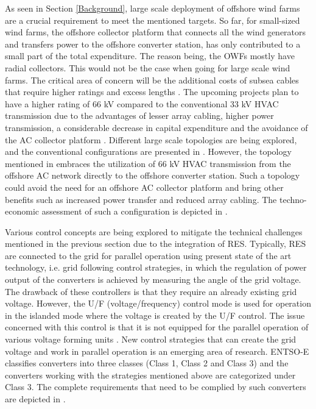 As seen in Section \ref{Background}, large scale deployment of offshore wind farms are a crucial requirement to meet the mentioned targets. So far, for small-sized wind farms, the offshore collector platform that connects all the wind generators and transfers power to the offshore converter station, has only contributed to a small part of the total expenditure. The reason being, the \gls{OWF}s mostly have radial collectors. This would not be the case when going for large scale wind farms. The critical area of concern will be the additional costs of subsea cables that require higher ratings and excess lengths \cite{quinonez-varela_electrical_2007}. The upcoming projects plan to have a higher rating of 66 kV compared to the conventional 33 kV \gls{HVAC} transmission due to the advantages of lesser array cabling, higher power transmission, a considerable decrease in capital expenditure and the avoidance of the \gls{AC} collector platform \cite{dnv66kv}. Different large scale topologies are being explored, and the conventional configurations are presented in \cite{guan_novel_2014}. However, the topology mentioned in \cite{lozada_ayala_dynamic_2018} embraces the utilization of 66 kV \gls{HVAC} transmission from the offshore \gls{AC} network directly to the offshore converter station. Such a topology could avoid the need for an offshore \gls{AC} collector platform and bring other benefits such as increased power transfer and reduced array cabling. The techno-economic assessment of such a configuration is depicted in \cite{misyris2020north}. 

Various control concepts are being explored to mitigate the technical challenges mentioned in the previous section due to the integration of \gls{RES}. Typically, \gls{RES} are connected to the grid for parallel operation using present state of the art technology, i.e. grid following control strategies, in which the regulation of power output of the converters is achieved by measuring the angle of the grid voltage. The drawback of these controllers is that they require an already existing grid voltage. However, the U/F (voltage/frequency) control mode is used for operation in the islanded mode where the voltage is created by the U/F control. The issue concerned with this control is that it is not equipped for the parallel operation of various voltage forming units \cite{weise2019comparison}. New control strategies that can create the grid voltage and work in parallel operation is an emerging area of research. ENTSO-E classifies converters into three classes (Class 1, Class 2 and Class 3) and the converters working with the strategies mentioned above are categorized under Class 3. The complete requirements that need to be complied by such converters are depicted in \cite{christensen2020high}.

